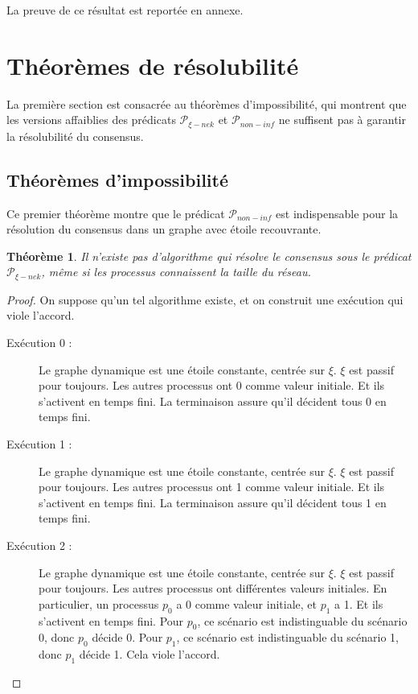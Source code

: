 \documentclass{article}
\newtheorem{theorem}{Théorème}
\begin{document}
La preuve de ce résultat est reportée en annexe.

\section{Théorèmes de résolubilité}

La première section est consacrée au théorèmes d'impossibilité, qui montrent que les versions affaiblies des prédicats $\mathcal{P}_{\xi-nek}$ et $\mathcal{P}_{non-inf}$ ne suffisent
pas à garantir la résolubilité du consensus.

\subsection{Théorèmes d'impossibilité}

Ce premier théorème montre que le prédicat $\mathcal{P}_{non-inf}$ est indispensable pour la résolution du consensus dans un graphe avec étoile recouvrante.

\begin{theorem}
	Il n'existe pas d'algorithme qui résolve le consensus sous le prédicat $\mathcal{P}_{\xi-nek}$, même si les processus connaissent la taille du réseau.
\end{theorem}
\begin{proof}
	On suppose qu'un tel algorithme existe, et on construit une exécution qui viole l'accord.

	\begin{description}
		\item[Exécution 0 : ] Le graphe dynamique est une étoile constante, centrée sur $\xi$. $\xi$ est passif pour toujours. Les autres processus ont 0 comme valeur initiale.
			Et ils s'activent en temps fini. La terminaison assure qu'il décident tous 0 en temps fini.

		\item[Exécution 1 : ] Le graphe dynamique est une étoile constante, centrée sur $\xi$. $\xi$ est passif pour toujours. Les autres processus ont 1 comme valeur initiale.
			Et ils s'activent en temps fini. La terminaison assure qu'il décident tous 1 en temps fini.

		\item[Exécution 2 : ] Le graphe dynamique est une étoile constante, centrée sur $\xi$. $\xi$ est passif pour toujours. Les autres processus ont différentes valeurs initiales.
			En particulier, un processus $p_0$ a 0 comme valeur initiale, et $p_1$ a 1.
			Et ils s'activent en temps fini. Pour $p_0$, ce scénario est indistinguable du scénario 0, donc $p_0$ décide 0.
			Pour $p_1$, ce scénario est indistinguable du scénario 1, donc $p_1$ décide 1.  Cela viole l'accord.
	\end{description}
\end{proof}
\end{document}
